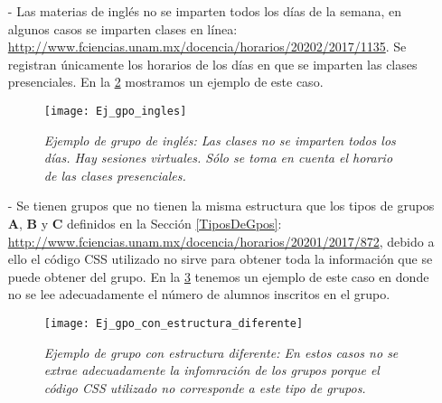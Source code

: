 \begin{itemize}
En la \figurename{\ref{horariosMultiples}} tenemos un ejemplo de este caso en donde el profesor imparte su clase los lunes, miércoles y viernes de 13-14hrs en el salón O215, hay una ayudantía los martes y jueves de 13-14hrs en el salón O215 y otra ayudantía los martes de 11-13hrs en el salón 304 (Yelizcalli). Se considera que esta materia inicia a las 13hrs y se imparte en el salón O215.

\begin{figure}[H]
\centering
\texttt{[image: Ej\_gpo\_horarios\_multiples]} %
\caption[\textit{Ejemplo de grupo con horarios múltiples}]{\textit{Ejemplo de grupo con horarios múltiples: En estos grupos sólo se toman en cuenta los horarios y salones en los que los profesores imparten clase.}}\label{horariosMultiples}
\end{figure}

\item[-] Las materias de inglés no se imparten todos los días de la semana, en algunos casos se imparten clases en línea: \url{http://www.fciencias.unam.mx/docencia/horarios/20202/2017/1135}. Se registran únicamente los horarios de los días en que se imparten las clases presenciales. En la \figurename{\ref{casoIngles}} mostramos un ejemplo de este caso.

\begin{figure}[H]
\centering
\texttt{[image: Ej\_gpo\_ingles]} %
\caption[\textit{Ejemplo de grupo de inglés}]{\textit{Ejemplo de grupo de inglés: Las clases no se imparten todos los días. Hay sesiones virtuales. Sólo se toma en cuenta el horario de las clases presenciales.}}\label{casoIngles}
\end{figure}

\item[-] Se tienen grupos que no tienen la misma estructura que los tipos de grupos \textbf{A}, \textbf{B} y \textbf{C} definidos en la Sección \ref{TiposDeGpos}: \url{http://www.fciencias.unam.mx/docencia/horarios/20201/2017/872}, debido a ello el código CSS utilizado no sirve para obtener toda la información que se puede obtener del grupo. En la \figurename{\ref{GpoEstructuraDiferente}} tenemos un ejemplo de este caso en donde no se lee adecuadamente el número de alumnos inscritos en el grupo.

\begin{figure}[H]
\centering
\texttt{[image: Ej\_gpo\_con\_estructura\_diferente]} %
\caption[\textit{Ejemplo de grupo con estructura diferente}]{\textit{Ejemplo de grupo con estructura diferente: En estos casos no se extrae adecuadamente la infomración de los grupos porque el código CSS utilizado no corresponde a este tipo de grupos.}}\label{GpoEstructuraDiferente}
\end{figure}

\end{itemize}